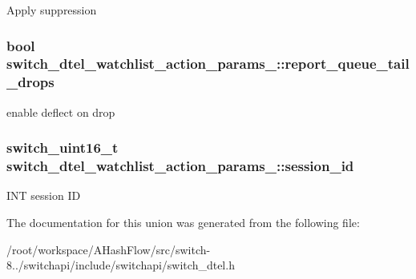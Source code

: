 Apply suppression \hypertarget{unionswitch__dtel__watchlist__action__params___aee571eee0b3f8b84fe58761df414498e}{
\subsubsection[{report\+\_\+queue\+\_\+tail\+\_\+drops}]{\setlength{\rightskip}{0pt plus 5cm}bool switch\+\_\+dtel\+\_\+watchlist\+\_\+action\+\_\+params\+\_\+\+::report\+\_\+queue\+\_\+tail\+\_\+drops}}\label{unionswitch__dtel__watchlist__action__params___aee571eee0b3f8b84fe58761df414498e}
enable deflect on drop \hypertarget{unionswitch__dtel__watchlist__action__params___a75472186ef19bd1b1d84ab8edf09363b}{
\subsubsection[{session\+\_\+id}]{\setlength{\rightskip}{0pt plus 5cm}switch\+\_\+uint16\+\_\+t switch\+\_\+dtel\+\_\+watchlist\+\_\+action\+\_\+params\+\_\+\+::session\+\_\+id}}\label{unionswitch__dtel__watchlist__action__params___a75472186ef19bd1b1d84ab8edf09363b}
I\+N\+T session I\+D 

The documentation for this union was generated from the following file\+:\begin{DoxyCompactItemize}
\item 
/root/workspace/\+A\+Hash\+Flow/src/switch-\/8../switchapi/include/switchapi/switch\+\_\+dtel.\+h\end{DoxyCompactItemize}
